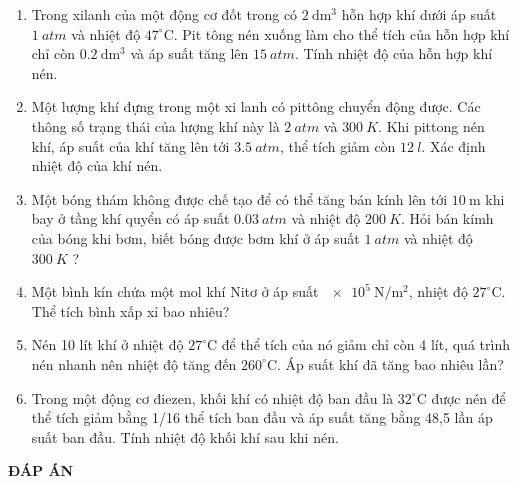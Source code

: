 \begin{enumerate}
	\item %
	Trong xilanh của một động cơ đốt trong có $\SI{2}{\deci\meter^3}$ hỗn hợp khí dưới áp suất $\SI{1}{atm}$ và nhiệt độ $47^\circ\text{C}$. Pit tông nén xuống làm cho thể tích của hỗn hợp khí chỉ còn $\SI{0,2}{\deci\meter^3}$ và áp suất tăng lên $\SI{15}{atm}$. Tính nhiệt độ của hỗn hợp khí nén.
	\begin{mcq}(4)
		\item $480^\circ\text{C}$.
		\item $470^\circ\text{C}$.
		\item $\SI{480}{K}$.
		\item $\SI{470}{K}$.
	\end{mcq}
	\item %
	Một lượng khí đựng trong một xi lanh có pittông chuyển động được. Các thông số trạng thái của lượng khí này là $\SI{2}{atm}$ và $\SI{300}{K}$. Khi pittong nén khí, áp suất của khí tăng lên tới $\SI{3,5}{atm}$, thể tích giảm còn $\SI{12}{l}$. Xác định nhiệt độ của khí nén.
	\item %
	Một bóng thám không được chế tạo để có thể tăng bán kính lên tới $\SI{10}{\meter}$ khi bay ở tầng khí quyển có áp suất $\SI{0,03}{atm}$ và nhiệt độ $\SI{200}{K}$. Hỏi bán kímh của bóng khi bơm, biết bóng được bơm khí ở áp suất $\SI{1}{atm}$ và nhiệt độ $\SI{300}{K}$ ?
	\item %
	Một bình kín chứa một mol khí Nitơ ở áp suất $\SI{e5}{\newton/\meter^2}$, nhiệt độ $27^\circ\text{C}$. Thể tích bình xấp xỉ bao nhiêu?
	\item %
	Nén 10 lít khí ở nhiệt độ $27^\circ\text{C}$ để thể tích của nó giảm chỉ còn 4 lít, quá trình nén nhanh nên nhiệt độ tăng đến $260^\circ\text{C}$. Áp suất khí đã tăng bao nhiêu lần?
	\item %
	Trong một động cơ điezen, khối khí có nhiệt độ ban đầu là $32^\circ\text{C}$ được nén để thể tích giảm bằng 1/16 thể tích ban đầu và áp suất tăng bằng 48,5 lần áp suất ban đầu. Tính nhiệt độ khối khí sau khi nén.
\end{enumerate}
\textbf{ĐÁP ÁN}
